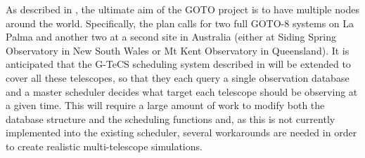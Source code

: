 \begin{colsection}

As described in , the ultimate aim of the GOTO project is to have multiple nodes around the world. Specifically, the plan calls for two full GOTO-8 systems on La Palma and another two at a second site in Australia (either at Siding Spring Observatory in New South Wales or Mt Kent Observatory in Queensland). It is anticipated that the G-TeCS scheduling system described in  will be extended to cover all these telescopes, so that they each query a single observation database and a master scheduler decides what target each telescope should be observing at a given time. This will require a large amount of work to modify both the database structure and the scheduling functions and, as this is not currently implemented into the existing scheduler, several workarounds are needed in order to create realistic multi-telescope simulations.

\end{colsection}


